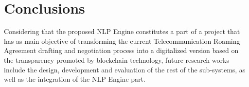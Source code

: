 \documentclass[conference]{style/IEEEtran}
\begin{document}
\section{Conclusions}
Considering that the proposed NLP Engine constitutes a part of a project that has as main objective of transforming the current Telecommunication Roaming Agreement drafting and negotiation process into a digitalized version based on the transparency promoted by blockchain technology, future research works include the design, development and evaluation of the rest of the sub-systems, as well as the integration of the NLP Engine part. 

\printbibliography

\vspace{12pt}
\end{document}
